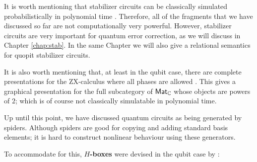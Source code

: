 It is worth mentioning that stabilizer circuits can be classically simulated probabilistically in polynomial time \cite{gottesmanknill}.  Therefore, all of the fragments that we have discussed so far are not computationally very powerful.  However, stabilizer circuits are very important for quantum error correction, as we will discuss in Chapter \ref{chap:stab}.  In the same Chapter we will also give a relational semantics for quopit stabilizer circuits.

It is also worth mentioning that, at least in the qubit case, there are complete presentations for the ZX-calculus where all phases are allowed \cite{zxcompleteb,zxcompletea}.  This gives a graphical presentation for the full subcategory of $\mathsf{Mat}_{\mathbb{C}}$ whose objects are powers of $2$; which is of course not classically simulatable in polynomial time.


Up until this point, we have discussed quantum circuits as being generated by spiders. Although spiders are good for copying and adding standard basis elements; it is hard to construct nonlinear behaviour using these generators.


To accommodate for this, {\bf $H$-boxes} were devised in the qubit case by \cite{zh}:

